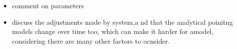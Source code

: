 \begin{itemize}
    \item comment on parameters
    \item discuss the adjustments made by system,a nd that the analytical poinitng models change over time too, which can make it harder for amodel, considering there are many other factors to ocnsider.
\end{itemize}

